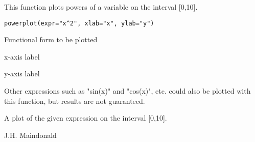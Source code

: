 \begin{Description}\relax
This function plots powers of a variable on the interval [0,10].
\end{Description}
\begin{Usage}
\begin{verbatim}
powerplot(expr="x^2", xlab="x", ylab="y")
\end{verbatim}
\end{Usage}
\begin{Arguments}
\begin{ldescription}
\item[\code{expr}] Functional form to be plotted
\item[\code{xlab}] x-axis label
\item[\code{ylab}] y-axis label
\end{ldescription}
\end{Arguments}
\begin{Details}\relax
Other expressions such as "sin(x)" and "cos(x)", etc.
could also be plotted with this function, but results are
not guaranteed.
\end{Details}
\begin{Value}
A plot of the given expression on the interval [0,10].
\end{Value}
\begin{Author}\relax
J.H. Maindonald
\end{Author}
\begin{Examples}
\end{Examples}

